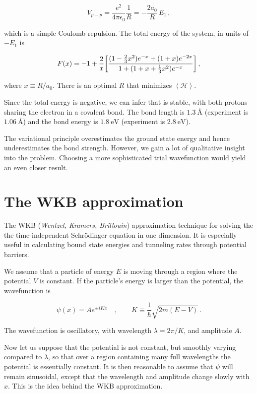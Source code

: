 \documentclass[12pt, titlepage]{article}
\newcommand{\exv}[1]{\left\langle #1 \right\rangle}
\begin{document}
\begin{equation*}
	V_{p-p} = \frac{e^2}{4\pi\epsilon_0}\frac{1}{R} = -\frac{2a_0}{R}\,E_1\,,
\end{equation*}

which is a simple Coulomb repulsion. The total energy of the system, in units of $-E_1$ is

\begin{equation}
	F(x) = -1 + \frac{2}{x}\qty[\frac{(1-\frac{2}{3}x^2)e^{-x} + (1+x)e^{-2x}}{1 + (1 + x + \frac{1}{3}x^2)e^{-x}}] \,,
\end{equation}

where $x \equiv R/a_0$. There is an optimal $R$ that minimizes $\exv{\mathcal{H}}$. 


Since the total energy is negative, we can infer that  is stable, with both protons sharing the electron in a covalent bond. The bond length is $\SI{1.3}{\angstrom}$ (experiment is $\SI{1.06}{\angstrom}$) and the bond energy is $\SI{1.8}{\eV}$ (experiment is $\SI{2.8}{\eV}$).

The variational principle overestimates the ground state energy and hence underestimates the bond strength. However, we gain a lot of qualitative insight into the problem. Choosing a more sophisticated trial wavefunction would yield an even closer result.

\section{The WKB approximation}
The WKB (\textit{Wentzel, Kramers, Brillouin}) approximation technique for solving the the time-independent Schrödinger equation in one dimension. It is especially useful in calculating bound state energies and tunneling rates through potential barriers.

We assume that a particle of energy $E$ is moving through a region where the potential $V$ is constant. If the particle's energy is larger than the potential, the wavefunction is 

\begin{equation}
	\psi(x) = Ae^{\pm iK x} \quad, \qquad K \equiv \frac{1}{\hbar}\sqrt{2m(E-V)} \,.
\end{equation}

The wavefunction is oscillatory, with wavelength $\lambda = 2\pi/K$, and amplitude $A$.

Now let us suppose that the potential is not constant, but smoothly varying compared to $\lambda$, so that over a region containing many full wavelengths the potential is essentially constant. It is then reasonable to assume that $\psi$ will remain sinusoidal, except that the wavelength and amplitude change slowly with $x$. This is the idea behind the WKB approximation.
\end{document}
